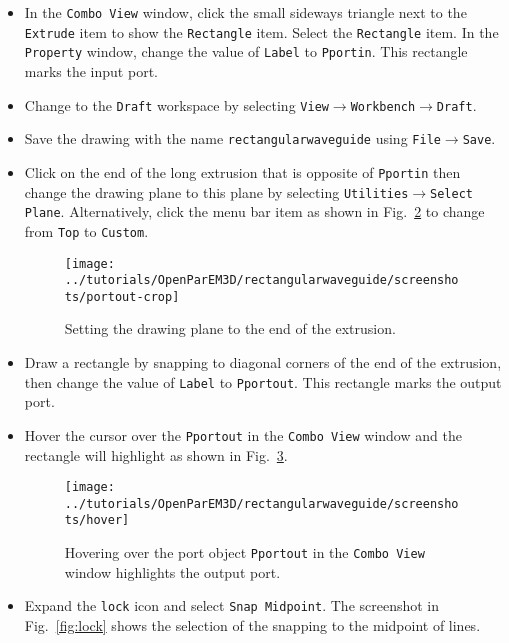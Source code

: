 \documentclass[titlepage]{article}
\renewcommand\_{\textunderscore\linebreak[1]}
\begin{document}
\begin{itemize}
\begin{figure}
  \centering
  \texttt{[image: ../tutorials/OpenParEM3D/rectangular\_waveguide/screenshots/extrusion]}
  \caption{Screen shot of the rectangle extruded 90 um.}
  \label{fig:extrusion}
\end{figure}
\item In the \texttt{Combo View} window, click the small sideways triangle next to the \texttt{Extrude} item to show the \texttt{Rectangle} item.  Select the \texttt{Rectangle} item.  In the \texttt{Property} window, change the value of \texttt{Label} to \newline \texttt{\_Pportin}.  This rectangle marks the input port.
\item Change to the \texttt{Draft} workspace by selecting \texttt{View}$\rightarrow$\texttt{Workbench}$\rightarrow$\texttt{Draft}.
\item Save the drawing with the name \texttt{rectangular\_waveguide} using \texttt{File}$\rightarrow$\texttt{Save}.
\item Click on the end of the long extrusion that is opposite of \texttt{\_Pportin} then change the drawing plane to this plane by selecting \texttt{Utilities}$\rightarrow$\texttt{Select Plane}.  Alternatively, click the menu bar item as shown in Fig.~\ref{fig:portout} to change from \texttt{Top} to \texttt{Custom}.
\begin{figure}
  \centering
  \texttt{[image: ../tutorials/OpenParEM3D/rectangular\_waveguide/screenshots/portout-crop]}
  \caption{Setting the drawing plane to the end of the extrusion.}
  \label{fig:portout}
\end{figure}
\item Draw a rectangle by snapping to diagonal corners of the end of the extrusion, then change the value of \texttt{Label} to \texttt{\_Pportout}. This rectangle marks the output port.
\item Hover the cursor over the \texttt{\_Pportout} in the \texttt{Combo View} window and the rectangle will highlight as shown in Fig.~\ref{fig:hover}.
\begin{figure}
  \centering
  \texttt{[image: ../tutorials/OpenParEM3D/rectangular\_waveguide/screenshots/hover]}
  \caption{Hovering over the port object \hbox{\texttt{\_Pportout}} in the \texttt{Combo View} window highlights the output port.}
  \label{fig:hover}
\end{figure}
\item Expand the \texttt{lock} icon and select \texttt{Snap Midpoint}.  The screenshot in Fig.~\ref{fig:lock} shows the selection of the snapping to the midpoint of lines.

\end{itemize}
\end{document}
